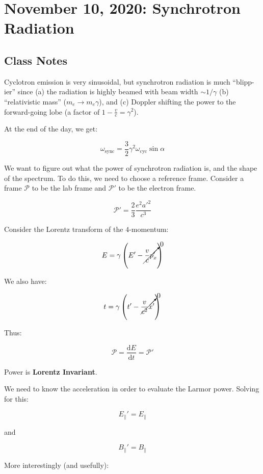 \documentclass{article}
\begin{document}
\newpage
\section{November 10, 2020: Synchrotron Radiation}

\subsection{Class Notes}

Cyclotron emission is very sinusoidal, but synchrotron radiation is much ``blipp-ier'' since (a) the radiation is highly beamed with beam width $\sim 1/\gamma$ (b) ``relativistic  mass'' ($m_e \rightarrow m_e \gamma$), and (c) Doppler shifting the power to the forward-going lobe (a factor of $1-\frac{v}{c} = \gamma^2$). 

At the end of the day, we get:

$$
\boxed{\omega_\text{sync} = \frac32 \gamma^2 \omega_\text{cyc} \sin \alpha}
$$

We want to figure out what the power of synchrotron radiation is, and the shape of the spectrum. To do this, we need to choose a reference frame. Consider a frame $\mathcal{P}$ to be the lab frame and $\mathcal{P}'$ to be the electron frame. 

$$
\mathcal{P}' = \frac23 \frac{e^2 a'^2}{c^3}
$$

Consider the Lorentz transform of the $4$-momentum:

$$
E = \gamma\left(E' - \cancelto{0}{\frac{v}{c}p_x'}\right)
$$

We also have:

$$
t = \gamma\left(t' - \cancelto{0}{\frac{v}{c^2}x'}\right)
$$

Thus:

$$
\mathcal{P} = \frac{\mathrm{d}E}{\mathrm{d}t} = \mathcal{P}'
$$

Power is \textbf{Lorentz Invariant}. 

We need to know the acceleration in order to evaluate the Larmor power. Solving for this:

$$
E_\parallel' = E_\parallel
$$

and 

$$
B_\parallel' = B_\parallel
$$

More interestingly (and usefully):
\end{document}
